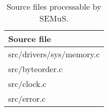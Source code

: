 
\begin{table}[h]
\scriptsize
\centering
\caption{Source files processable by SEMuS.}
\label{table:processable}
\begin{tabular}{l}
\hline
\textbf{Source file}\\
\hline
src/drivers/sys/memory.c\\
src/byteorder.c\\
src/clock.c\\
src/error.c\\
\hline
\end{tabular}
\end{table}